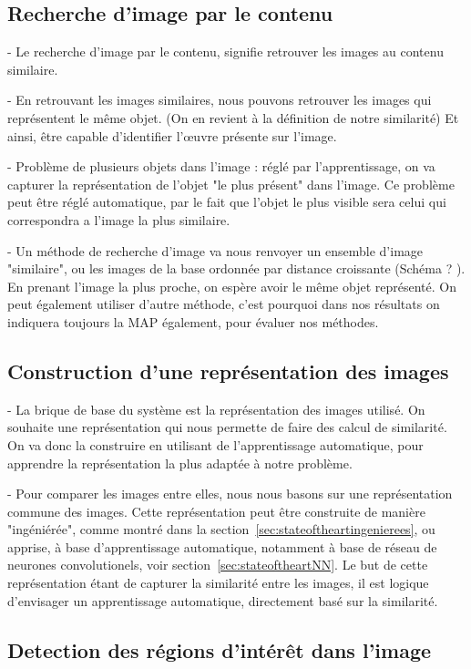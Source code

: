 \subsection{Recherche d'image par le contenu}

 - Le recherche d'image par le contenu, signifie retrouver les images au contenu similaire.
 
 - En retrouvant les images similaires, nous pouvons retrouver les images qui représentent le même objet. (On en revient à la définition de notre similarité) Et ainsi, être capable d'identifier l'œuvre présente sur l'image.
 
 - Problème de plusieurs objets dans l'image : réglé par l'apprentissage, on va capturer la représentation de l'objet "le plus présent" dans l'image. Ce problème peut être réglé automatique, par le fait que l'objet le plus visible sera celui qui correspondra a l'image la plus similaire.
 
 - Un méthode de recherche d'image va nous renvoyer un ensemble d'image "similaire", ou les images de la base ordonnée par distance croissante (Schéma ? ). En prenant l'image la plus proche, on espère avoir le même objet représenté. On peut également utiliser d'autre méthode, c'est pourquoi dans nos résultats on indiquera toujours la MAP également, pour évaluer nos méthodes.
 
 
\subsection{Construction d'une représentation des images}

 - La brique de base du système est la représentation des images utilisé. On souhaite une représentation qui nous permette de faire des calcul de similarité. On va donc la construire en utilisant de l'apprentissage automatique, pour apprendre la représentation la plus adaptée à notre problème.
 
 - Pour comparer les images entre elles, nous nous basons sur une représentation commune des images. Cette représentation peut être construite de manière "ingéniérée", comme montré dans la section~\ref{sec:stateoftheartingenierees}, ou apprise, à base d'apprentissage automatique, notamment à base de réseau de neurones convolutionels, voir section~\ref{sec:stateoftheartNN}. Le but de cette représentation étant de capturer la similarité entre les images, il est logique d'envisager un apprentissage automatique, directement basé sur la similarité.


\subsection{Detection des régions d'intérêt dans l'image}

